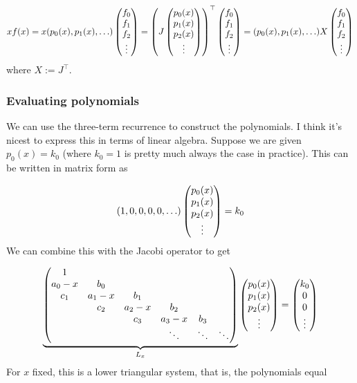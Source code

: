 \documentclass[12pt,a4paper]{article}
\begin{document}
\[
x f(x) = x (p_0(x) ,  p_1(x) , \ldots ) \begin{pmatrix}f_0\\ f_1\\f_2\\\vdots\end{pmatrix} =
    \left(J \begin{pmatrix} p_0(x) \cr p_1(x) \cr p_2(x) \cr \vdots \end{pmatrix}\right)^\top  \begin{pmatrix}f_0\\ f_1\\f_2\\\vdots\end{pmatrix} = (p_0(x) ,  p_1(x) , \ldots ) X \begin{pmatrix}f_0\\ f_1\\f_2\\\vdots\end{pmatrix}
\]
where $X := J^\top$. 

\subsubsection{Evaluating polynomials}
We can use the three-term recurrence to construct the polynomials.  I think it's nicest to express this in terms of linear algebra.  Suppose we are given $p_0(x) = k_0$ (where $k_0 = 1$ is pretty much always the case in practice). This can be written in matrix form as

\[
(1,0,0,0,0,\ldots) \begin{pmatrix} p_0(x) \cr p_1(x) \cr p_2(x) \cr \vdots \end{pmatrix} = k_0
\]
We can combine this with the Jacobi operator to get

\[
\underbrace{\begin{pmatrix}
1 \\
a_0-x & b_0 \\
c_1 & a_1-x & b_1 \\
& c_2 & a_2-x & b_2 \cr
&& c_3 & a_3-x & b_3 \cr
&&&\ddots & \ddots & \ddots
\end{pmatrix}}_{L_x} \begin{pmatrix} p_0(x) \cr p_1(x) \cr p_2(x) \cr \vdots \end{pmatrix} = \begin{pmatrix} k_0\cr 0 \cr 0 \cr \vdots \end{pmatrix}
\]
For $x$ fixed, this is a lower triangular system, that is, the polynomials equal 
\end{document}

